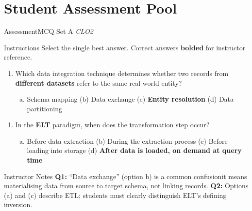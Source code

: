 \documentclass[aspectratio=169,10pt]{beamer}
\begin{document}
\section{Student Assessment Pool}

\begin{frame}{Assessment\textemdash MCQ Set A \hfill\small\textit{CLO2}}
  \begin{exampleblock}{Instructions}
    Select the single best answer.  Correct answers \textbf{bolded} for instructor reference.
  \end{exampleblock}
  \vspace{8pt}
  \begin{enumerate}[\textbf{Q1.}]
    \item Which data integration technique determines whether two records from \textbf{different datasets} refer to the same real-world entity?
    \begin{enumerate}[(a)]
      \item Schema mapping \quad
      (b) Data exchange \quad
      (c) \textbf{Entity resolution} \quad
      (d) Data partitioning
    \end{enumerate}
  \end{enumerate}
  \vspace{8pt}
  \begin{enumerate}[\textbf{Q2.}]
    \item In the \textbf{ELT} paradigm, when does the transformation step occur?
    \begin{enumerate}[(a)]
      \item Before data extraction \quad
      (b) During the extraction process \quad
      (c) Before loading into storage \quad
      (d) \textbf{After data is loaded, on demand at query time}
    \end{enumerate}
  \end{enumerate}
  \vspace{8pt}
  \begin{alertblock}{Instructor Notes}
    \textbf{Q1:} ``Data exchange'' (option b) is a common confusion\textemdash it means materialising data from source to target schema, not linking records.  \textbf{Q2:} Options (a) and (c) describe ETL; students must clearly distinguish ELT's defining inversion.
  \end{alertblock}
\end{frame}
\end{document}
